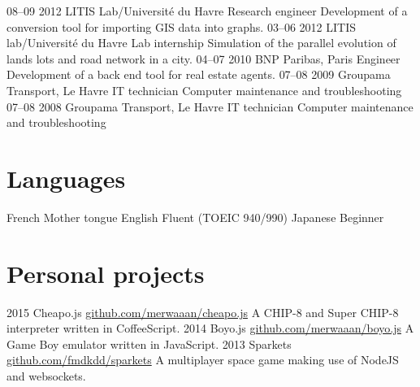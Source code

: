 \documentclass[]{friggeri-cv}
\begin{document}
\begin{entrylist}
  \entry
    {08–09 2012}
    {LITIS Lab/Université du Havre}
    {Research engineer}
    {Development of a conversion tool for importing GIS data into graphs.}
  \entry
    {03–06 2012}
    {LITIS lab/Université du Havre}
    {Lab internship}
    {Simulation of the parallel evolution of lands lots and road network in a city.}
  \entry
    {04–07 2010}
    {BNP Paribas, Paris}
    {Engineer}
    {Development of a back end tool for real estate agents.}
  \entry
    {07–08 2009}
    {Groupama Transport, Le Havre}
    {IT technician}
    {Computer maintenance and troubleshooting}
  \entry
    {07–08 2008}
    {Groupama Transport, Le Havre}
    {IT technician}
    {Computer maintenance and troubleshooting}
\end{entrylist}

\section{Languages}

\begin{entrylist}
  \entry
    {}
    {French}
    {}
		{Mother tongue}
  \entry
    {}
    {English}
    {}
    {Fluent (TOEIC 940/990)}
  \entry
    {}
    {Japanese}
    {}
    {Beginner}
\end{entrylist}

\section{Personal projects}

\begin{entrylist}
  \entry
    {2015}
    {Cheapo.js}
    {\href{http://github.com/merwaaan/cheapo.js}{github.com/merwaaan/cheapo.js}}
    {A CHIP-8 and Super CHIP-8 interpreter written in CoffeeScript.}
  \entry
    {2014}
    {Boyo.js}
    {\href{http://github.com/merwaaan/boyo.js}{github.com/merwaaan/boyo.js}}
    {A Game Boy emulator written in JavaScript.}
  \entry
    {2013}
    {Sparkets}
    {\href{http://github.com/fmdkdd/sparkets}{github.com/fmdkdd/sparkets}}
    {A multiplayer space game making use of NodeJS and websockets.}

\end{entrylist}
\end{document}
